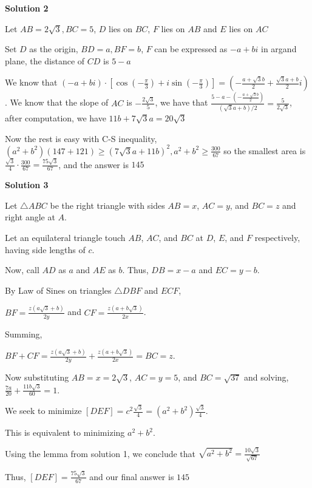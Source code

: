 \begin{enumerate}
 



\textbf{Solution 2}

Let $AB=2\sqrt{3}, BC=5$, $D$ lies on $BC$, $F$ lies on $AB$ and $E$ lies on $AC$

 Set $D$ as the origin, $BD=a,BF=b$, $F$ can be expressed as $-a+bi$ in argand plane, the distance of $CD$ is $5-a$

 We know that $(-a+bi)\cdot[\cos(-\frac{\pi}{3})+ i\sin(-\frac{\pi}{3})]=(-\frac{a+\sqrt{3}b}{2}+\frac{\sqrt{3}a+b}{2}i)$. We know that the slope of $AC$ is $-\frac{2\sqrt{3}}{5}$, we have that $\frac{5-a-(-\frac{a+\sqrt{3}b}{2})}{(\sqrt{3}a+b)/2}=\frac{5}{2\sqrt{3}}$, after computation, we have $11b+7\sqrt{3}a=20\sqrt{3}$

 Now the rest is easy with C-S inequality, $(a^2+b^2)(147+121)\geq (7\sqrt{3}a+11b)^2, a^2+b^2\geq \frac{300}{67}$ so the smallest area is $\frac{\sqrt{3}}{4}\cdot \frac{300}{67}=\frac{75\sqrt{3}}{67}$, and the answer is $\boxed{145}$




\textbf{Solution 3}

Let $\triangle ABC$ be the right triangle with sides $AB = x$, $AC = y$, and $BC = z$ and right angle at $A$.

 Let an equilateral triangle touch $AB$, $AC$, and $BC$ at $D$, $E$, and $F$ respectively, having side lengths of $c$.

 Now, call $AD$ as $a$ and $AE$ as $b$. Thus, $DB = x-a$ and $EC = y-b$.

 By Law of Sines on triangles $\triangle DBF$ and $ECF$,

 $BF = \frac{z(a\sqrt{3}+b)} {2y}$ and $CF = \frac{z(a+b\sqrt{3})} {2x}$.

 Summing, 

 $BF+CF =  \frac{z(a\sqrt{3}+b)} {2y} + \frac{z(a+b\sqrt{3})} {2x} = BC = z$.

 Now substituting $AB = x = 2\sqrt{3}$, $AC = y = 5$, and $BC = \sqrt{37}$ and solving,$\frac{7a}{20} + \frac{11b\sqrt{3}}{60} = 1$.

 We seek to minimize $[DEF] = c^2 \frac{\sqrt{3}}{4} = (a^2 + b^2) \frac{\sqrt{3}}{4}$.

 This is equivalent to minimizing $a^2+b^2$.

 Using the lemma from solution 1, we conclude that $\sqrt{a^2+b^2} = \frac{10\sqrt{3}}{\sqrt{67}}$

 Thus, $[DEF] = \frac{75\sqrt{3}}{67}$ and our final answer is $\boxed{145}$


\end{enumerate}
